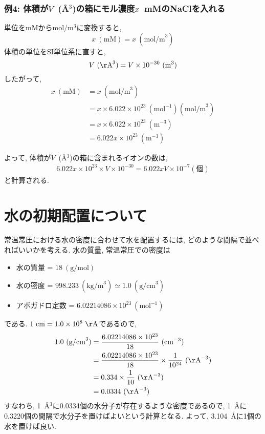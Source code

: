 \subsubsection{例4: 体積が$V$~({\AA}$^3$)の箱にモル濃度$x$~mMのNaClを入れる}

単位をmMからmol/m$^3$に変換すると, 
\begin{equation}
    x~(\mathrm{mM}) = x ~(\mathrm{mol/m}^{3})
\end{equation}
体積の単位をSI単位系に直すと, 
\begin{equation}
    V~(\mathrm{\AA}^{3}) =
    V \times 10^{-30} ~(\mathrm{m}^3)
\end{equation}
したがって, 
\begin{align}
    x~(\mathrm{mM}) &=
    x~(\mathrm{mol/m}^3) \\ &=
    x \times 6.022 \times 10^{23} ~(\mathrm{mol}^{-1})(\mathrm{mol/m}^3) \\ &=
    x \times 6.022 \times 10^{23} ~(\mathrm{m}^{-3}) \\ &=
    6.022 x \times 10^{23} ~(\mathrm{m}^{-3})
\end{align}

よって, 体積が$V$~({\AA}$^3$)の箱に含まれるイオンの数は, 
\begin{align}
    6.022 x \times 10^{23} \times V \times 10^{-30} =
    6.022 x V \times 10^{-7} (\mathrm{個})
\end{align}
と計算される. 

\clearpage
\section{水の初期配置について}
常温常圧における水の密度に合わせて水を配置するには, どのような間隔で並べればいいかを考える. 
水の質量, 常温常圧での密度は
\begin{itemize}
    \item 水の質量 = $18~(\mathrm{g/mol})$
    \item 水の密度 = $998.233~(\mathrm{kg/m}^3) \simeq 1.0~(\mathrm{g/cm}^3)$
    \item アボガドロ定数 = $6.02214086 \times 10^{23} ~(\mathrm{mol}^{-1})$
\end{itemize}
である. 
$1~\mathrm{cm} = 1.0 \times 10^{8}~{\mathrm{\AA}}$であるので, 
\begin{align}
    1.0~(\mathrm{g/cm}^{3}) &=
    \frac{6.02214086 \times 10^{23}}{18} ~(\mathrm{cm}^{-3}) \\ &=
    \frac{6.02214086 \times 10^{23}}{18} \times \frac{1}{10^{24}}
    ~(\mathrm{\AA}^{-3}) \\ &=
    0.334 \times \frac{1}{10} ~(\mathrm{\AA}^{-3}) \\ &=
    0.0334 ~(\mathrm{\AA}^{-3})
\end{align}
すなわち, 1~{\AA}$^3$に0.0334個の水分子が存在するような密度であるので, 1~{\AA}に0.3220個の間隔で水分子を置けばよいという計算となる. 
よって, 3.104~{\AA}に1個の水を置けば良い. 


